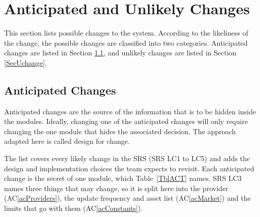 \documentclass[12pt, titlepage]{article}
\newcommand{\acref}[1]{AC\ref{#1}}
\begin{document}
\section{Anticipated and Unlikely Changes} \label{SecChange}

This section lists possible changes to the system. According to the likeliness
of the change, the possible changes are classified into two
categories. Anticipated changes are listed in Section \ref{SecAchange}, and
unlikely changes are listed in Section \ref{SecUchange}.

\subsection{Anticipated Changes} \label{SecAchange}

Anticipated changes are the source of the information that is to be hidden
inside the modules. Ideally, changing one of the anticipated changes will only
require changing the one module that hides the associated decision. The approach
adapted here is called design for
change.

The list covers every likely change in the SRS (SRS LC1 to LC5) and adds the
design and implementation choices the team expects to revisit. Each anticipated
change is the secret of one module, which Table~\ref{TblACT} names. SRS LC3
names three things that may change, so it is split here into the provider
(\acref{acProviders}), the update frequency and asset list (\acref{acMarket})
and the limits that go with them (\acref{acConstants}).
\end{document}

